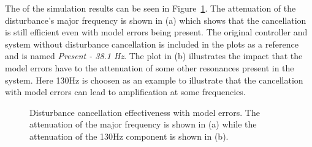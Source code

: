 The \abbrFFT of the simulation results can be seen in Figure~\ref{fig:hc_model_error}. The attenuation of the disturbance's major frequency is shown in (a) which shows that the cancellation is still efficient even with model errors being present. The original controller and system without disturbance cancellation is included in the plots as a reference and is named \emph{Present - 38.1 Hz}. The plot in (b) illustrates the impact that the model errors have to the attenuation of some other resonances present in the system. Here 130Hz is choosen as an example to illustrate that the cancellation with model errors can lead to amplification at some frequencies.


\begin{figure}[h!]
  \centering %
  \qquad
  \caption{\label{fig:hc_model_error} Disturbance cancellation effectiveness with model errors. The attenuation of the major frequency is shown in (a) while the attenuation of the 130Hz component is shown in (b).}
\end{figure}


